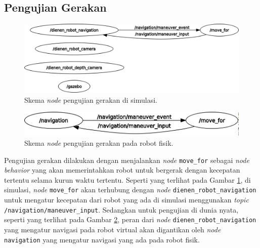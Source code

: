 \subsection{Pengujian Gerakan}
\label{subsec:pengujiangerakan}

\begin{figure} [ht]
  \centering
  \includegraphics[scale=0.25]{images/rosgraph-simulation-movement-test.png}
  \caption{Skema \emph{node} pengujian gerakan di simulasi.}
  \label{fig:nodeujigeraksimulasi}
\end{figure}

\begin{figure} [ht]
  \centering
  \includegraphics[scale=0.3]{images/rosgraph-real-robot-movement-test.png}
  \caption{Skema \emph{node} pengujian gerakan pada robot fisik.}
  \label{fig:nodeujigerakfisik}
\end{figure}

Pengujian gerakan dilakukan dengan menjalankan \emph{node} \lstinline{move_for} sebagai \emph{node behavior} yang akan memerintahkan robot untuk bergerak dengan kecepatan tertentu selama kurun waktu tertentu.
Seperti yang terlihat pada Gambar \ref{fig:nodeujigeraksimulasi}, di simulasi, \emph{node} \lstinline{move_for} akan terhubung dengan \emph{node} \lstinline{dienen_robot_navigation} untuk mengatur kecepatan dari robot yang ada di simulasi menggunakan \emph{topic} \lstinline{/navigation/maneuver_input}.
Sedangkan untuk pengujian di dunia nyata, seperti yang terlihat pada Gambar \ref{fig:nodeujigerakfisik}, peran dari \emph{node} \lstinline{dienen_robot_navigation} yang mengatur navigasi pada robot virtual akan digantikan oleh \emph{node} \lstinline{navigation} yang mengatur navigasi yang ada pada robot fisik.


